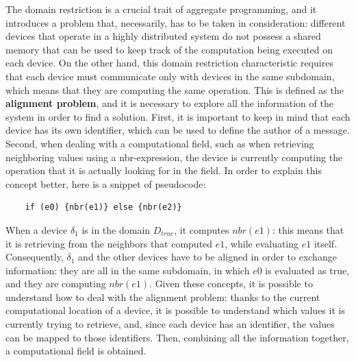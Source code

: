 The domain restriction is a crucial trait of aggregate programming, and it introduces a problem that, necessarily, has to be taken in consideration: different devices that operate in a highly distributed system do not possess a shared memory that can be used to keep track of the computation being executed on each device. On the other hand, this domain restriction characteristic requires that each device must communicate only with devices in the same subdomain, which means that they are computing the same operation.\newline
This is defined as the \textbf{alignment problem}, and it is necessary to explore all the information of the system in order to find a solution. First, it is important to keep in mind that each device has its own identifier, which can be used to define the author of a message. Second, when dealing with a computational field, such as when retrieving neighboring values using a nbr-expression, the device is currently computing the operation that it is actually looking for in the field.\newline
In order to explain this concept better, here is a snippet of pseudocode:
\begin{lstlisting}
    if (e0) {nbr(e1)} else {nbr(e2)}
\end{lstlisting}
When a device $\delta_1$ is in the domain $D_{true}$, it computes $nbr(e1)$: this means that it is retrieving from the neighbors that computed $e1$, while evaluating $e1$ itself.\newline
Consequently, $\delta_1$ and the other devices have to be aligned in order to exchange information: they are all in the same subdomain, in which $e0$ is evaluated as true, and they are computing $nbr(e1)$.\newline
Given these concepts, it is possible to understand how to deal with the alignment problem: thanks to the current computational location of a device, it is possible to understand which values it is currently trying to retrieve, and, since each device has an identifier, the values can be mapped to those identifiers. Then, combining all the information together, a computational field is obtained.

